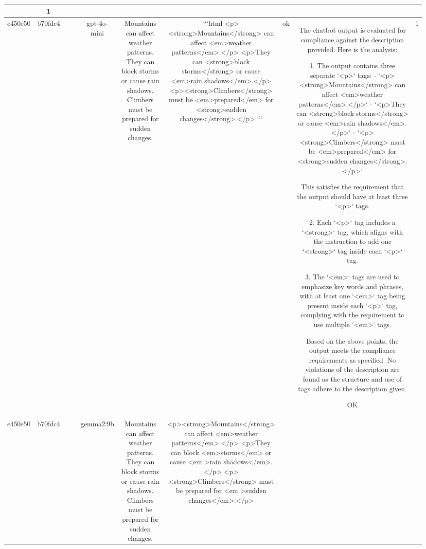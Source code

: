 \begin{table}[h!]
\begin{tabular}{|c|c|c|c|c|c|c|c|c|c|}
{{2. The guideline specifies that inside each `<p>` tag, there should be at least one `<strong>` tag and multiple `<em>` tags to emphasize key words and phrases.

3. There are sentences such as `<p>The recipe calls for two cups of flour.</p>` and `<p>Mix in the wet ingredients until smooth.</p>` that do not contain any `<strong>` or `<em>` tags, which violates the requirement.

Given these observations, the element of adding emphasis with `<strong>` and `<em>` tags is not consistently applied inside each `<p>` tag throughout the output, leading to a non-compliance with the description.

ERR & 1\\
\hline
e450e50 & b70fdc4 &  &  & gpt-4o-mini & Mountains can affect weather patterns. They can block storms or cause rain shadows. Climbers must be prepared for sudden changes. & ```html
<p><strong>Mountains</strong> can affect <em>weather patterns</em>.</p>
<p>They can <strong>block storms</strong> or cause <em>rain shadows</em>.</p>
<p><strong>Climbers</strong> must be <em>prepared</em> for <strong>sudden changes</strong>.</p>
``` & ok & The chatbot output is evaluated for compliance against the description provided. Here is the analysis:

1. The output contains three separate `<p>` tags:
   - `<p><strong>Mountains</strong> can affect <em>weather patterns</em>.</p>`
   - `<p>They can <strong>block storms</strong> or cause <em>rain shadows</em>.</p>`
   - `<p><strong>Climbers</strong> must be <em>prepared</em> for <strong>sudden changes</strong>.</p>`
   
   This satisfies the requirement that the output should have at least three `<p>` tags.

2. Each `<p>` tag includes a `<strong>` tag, which aligns with the instruction to add one `<strong>` tag inside each `<p>` tag. 

3. The `<em>` tags are used to emphasize key words and phrases, with at least one `<em>` tag being present inside each `<p>` tag, complying with the requirement to use multiple `<em>` tags.

Based on the above points, the output meets the compliance requirements as specified. No violations of the description are found as the structure and use of tags adhere to the description given.

OK & 1\\
\hline
e450e50 & b70fdc4 &  &  & gemma2:9b & Mountains can affect weather patterns. They can block storms or cause rain shadows. Climbers must be prepared for sudden changes. & <p><strong>Mountains</strong> can affect <em>weather patterns</em>.</p>
<p>They can block <em>storms</em> or cause <em >rain shadows</em>.</p>
<p><strong>Climbers</strong> must be prepared for <em >sudden changes</em>.</p>  


}}
\end{tabular}
\end{table}
